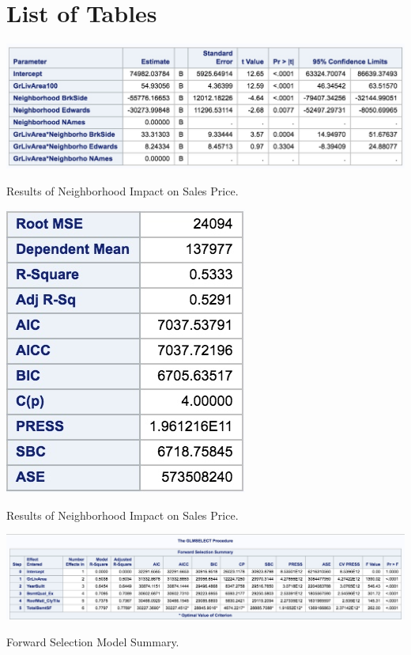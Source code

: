 \documentclass[11pt]{scrartcl} %
\begin{document}
\section{List of Tables}
\label{sec:Tables}
\hrulefill
\begin{table}[H] %
	\centering %
	\includegraphics[scale=.3]{../graphics/A1NHcomp}
	\caption{Results of Neighborhood Impact on Sales Price.}
	\label{tab:SMM}
\end{table}
\hrulefill
\begin{table}[H] %
	\centering %
	\includegraphics[scale=.4]{../graphics/A1NBMLRResults}
	\caption{Results of Neighborhood Impact on Sales Price.}
	\label{tab:A1Results}
\end{table}
\hrulefill
\begin{table}[H] %
	\centering %
	\includegraphics[scale=.25]{../graphics/A2FWfeatures}
	\caption{Forward Selection Model Summary.}
	\label{tab:A2FWsummary}
\end{table}
\end{document}
